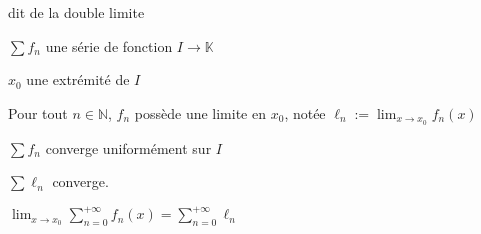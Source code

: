    \begin{theo}{dit de la double limite}{}
        \begin{soient}
            \item $\sum f_n$ une série de fonction $I \to \mathbb{K}$
            \item $x_0$ une extrémité de $I$
        \end{soient}
        \begin{suppose}
            \item Pour tout $n \in \mathbb{N}$, $f_n$ possède une limite en $x_0$, notée $\ell_n := \lim_{x \to x_0} f_n(x)$
            \item $\sum f_n$ converge uniformément sur $I$
        \end{suppose}
        \begin{alors}
            \item $\sum \ell_n$ converge.
            \item $\lim_{x \to x_0} \sum_{n=0}^{+\infty} f_n(x) = \sum_{n=0}^{+\infty} \ell_n$
        \end{alors}
    \end{theo}

